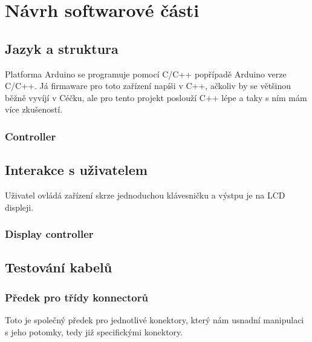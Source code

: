
\section{Návrh softwarové části}

\subsection{Jazyk a struktura}
Platforma Arduino se programuje pomocí C/C++ popřípadě Arduino verze C/C++. Já firmaware pro toto zařízení napíši v C++, ačkoliv by se většinou běžně vyvíjí v Céčku, ale pro tento projekt poslouží C++ lépe a taky s ním mám více zkušeností.
\newpage
\subsubsection{Controller}


\subsection{Interakce s uživatelem}
Uživatel ovládá zařízení skrze jednoduchou klávesničku a výstpu je na LCD displeji.

\newpage
\subsubsection{Display controller}




\subsection{Testování kabelů}
\newpage
\subsubsection{Předek pro třídy konnectorů}

Toto je společný předek pro jednotlivé konektory, který nám usnadní manipulaci s jeho potomky, tedy již specifickými konektory.
